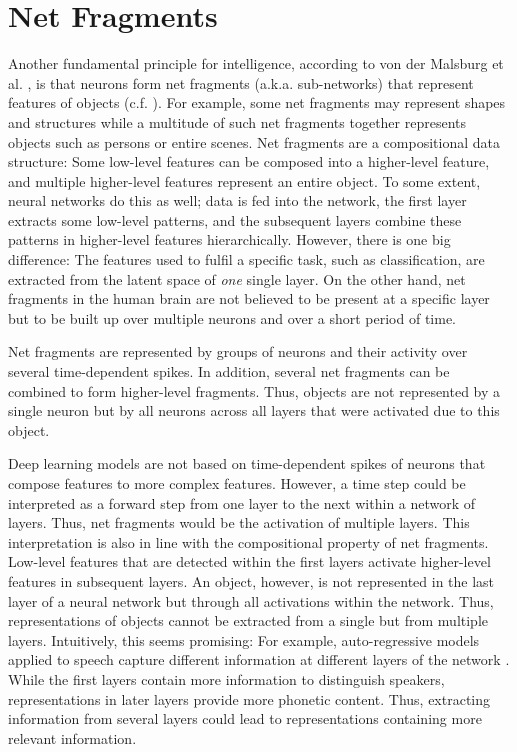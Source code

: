 \section{Net Fragments}
Another fundamental principle for intelligence, according to von der Malsburg et al. , is that neurons form net fragments (a.k.a. sub-networks) that represent features of objects (c.f. ).
For example, some net fragments may represent shapes and structures while a multitude of such net fragments together represents objects such as persons or entire scenes.
Net fragments are a compositional data structure: Some low-level features can be composed into a higher-level feature, and multiple higher-level features represent an entire object.
To some extent, neural networks do this as well; data is fed into the network, the first layer extracts some low-level patterns, and the subsequent layers combine these patterns in higher-level features hierarchically.
However, there is one big difference: The features used to fulfil a specific task, such as classification, are extracted from the latent space of \emph{one} single layer.
On the other hand, net fragments in the human brain are not believed to be present at a specific layer but to be built up over multiple neurons and over a short period of time.

\begin{claim}
	Net fragments are represented by groups of neurons and their activity over several time-dependent spikes. In addition, several net fragments can be combined to form higher-level fragments. Thus, objects are not represented by a single neuron but by all neurons across all layers that were activated due to this object.
\end{claim}

Deep learning models are not based on time-dependent spikes of neurons that compose features to more complex features.
However, a time step could be interpreted as a forward step from one layer to the next within a network of layers.
Thus, net fragments would be the activation of multiple layers.
This interpretation is also in line with the compositional property of net fragments.
Low-level features that are detected within the first layers activate higher-level features in subsequent layers.
An object, however, is not represented in the last layer of a neural network but through all activations within the network.
Thus, representations of objects cannot be extracted from a single but from multiple layers.
Intuitively, this seems promising:
For example, auto-regressive models applied to speech capture different information at different layers of the network .
While the first layers contain more information to distinguish speakers, representations in later layers provide more phonetic content.
Thus, extracting information from several layers could lead to representations containing more relevant information.

